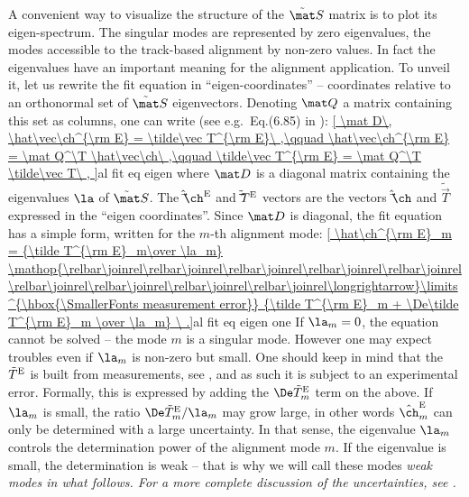 A convenient way to visualize the structure of the $\tilde\mat S$ matrix is to plot its eigen-spectrum. The singular modes are represented by zero eigenvalues, the modes accessible to the track-based alignment by non-zero values. In fact the eigenvalues have an important meaning for the alignment application. To unveil it, let us rewrite the fit equation  in ``eigen-coordinates'' -- coordinates relative to an orthonormal set of $\tilde\mat S$ eigenvectors. Denoting $\mat Q$ a matrix containing this set as columns, one can write (see e.g.~Eq.(6.85) in ):
\eqref{
	\mat D\, \hat\vec\ch^{\rm E} = \tilde\vec T^{\rm E}\ ,\qquad
	\hat\vec\ch^{\rm E} = \mat Q^\T \hat\vec\ch\ ,\qquad
	\tilde\vec T^{\rm E} = \mat Q^\T \tilde\vec T\ ,
}{al fit eq eigen}
where $\mat D$ is a diagonal matrix containing the eigenvalues $\la$ of $\tilde\mat S$. The $\hat\vec\ch^{\rm E}$ and $\tilde\vec T^{\rm E}$ vectors are the vectors $\hat\vec\ch$ and $\tilde\vec T$ expressed in the ``eigen coordinates''. Since $\mat D$ is diagonal, the fit equation has a simple form, written for the $m$-th alignment mode:
\eqref{
	\hat\ch^{\rm E}_m = {\tilde T^{\rm E}_m\over \la_m}
	\mathop{\relbar\joinrel\relbar\joinrel\relbar\joinrel\relbar\joinrel\relbar\joinrel\relbar\joinrel\relbar\joinrel\relbar\joinrel\relbar\joinrel\longrightarrow}\limits^{\hbox{\SmallerFonts measurement error}}
	{\tilde T^{\rm E}_m + \De\tilde T^{\rm E}_m \over \la_m}
\ .}{al fit eq eigen one}
If $\la_m = 0$, the equation cannot be solved -- the mode $m$ is a singular mode. However one may expect troubles even if $\la_m$ is non-zero but small. One should keep in mind that the $\tilde T^{\rm E}$ is built from measurements, see , and as such it is subject to an experimental error. Formally, this is expressed by adding the $\De\tilde T^{\rm E}_m$ term on the \rhs{} above. If $\la_m$ is small, the ratio $\De\tilde T^{\rm E}_m/\la_m$ may grow large, in other words $\hat\ch^{\rm E}_m$ can only be determined with a large uncertainty. In that sense, the eigenvalue $\la_m$ controls the determination power of the alignment mode $m$. If the eigenvalue is small, the determination is weak -- that is why we will call these modes \em{weak modes} in what follows. For a more complete discussion of the uncertainties, see .


